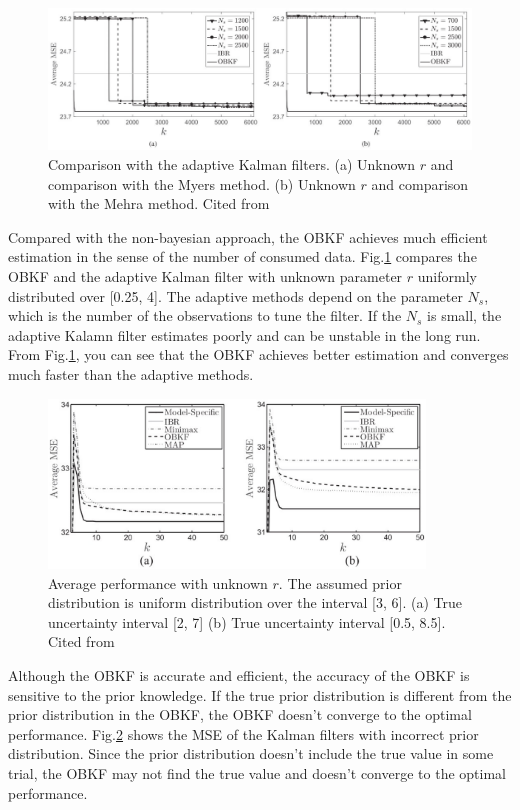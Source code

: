 \begin{figure}[h]
    \begin{center}
    \includegraphics[width=15cm]{img/cmp_adaptive.eps}
    \caption{Comparison with the adaptive Kalman filters. (a) Unknown $r$ and comparison with the Myers method\cite{Myers1976}. (b) Unknown $r$ and comparison with the Mehra method\cite{Mehra1972}. Cited from \cite{Dehghannasiri2018}}
    \label{fig:cmp_adaptive}
    \end{center}
\end{figure}

Compared with the non-bayesian approach, the OBKF achieves much efficient estimation in the sense of the number of consumed data. Fig.\ref{fig:cmp_adaptive} compares the OBKF and the adaptive Kalman filter with unknown parameter $r$ uniformly distributed over [0.25, 4]. The adaptive methods depend on the parameter $N_s$, which is the number of the observations to tune the filter. If the $N_s$ is small, the adaptive Kalamn filter estimates poorly and can be unstable in the long run. From Fig.\ref{fig:cmp_adaptive}, you can see that the OBKF achieves better estimation and converges much faster than the adaptive methods.

\begin{figure}[H]
    \begin{center}
    \includegraphics[width=10cm]{img/wrong_prior.eps}
    \caption{Average performance with unknown $r$. The assumed prior distribution is uniform distribution over the interval [3, 6]. (a) True uncertainty interval [2, 7] (b) True uncertainty interval [0.5, 8.5]. Cited from \cite{Dehghannasiri2018}}
    \label{fig:wrong_prior}
    \end{center}
\end{figure}

Although the OBKF is accurate and efficient, the accuracy of the OBKF is sensitive to the prior knowledge. If the true prior distribution is different from the prior distribution in the OBKF, the OBKF doesn't converge to the optimal performance. Fig.\ref{fig:wrong_prior} shows the MSE of the Kalman filters with incorrect prior distribution. Since the prior distribution doesn't include the true value in some trial, the OBKF may not find the true value and doesn't converge to the optimal performance. 